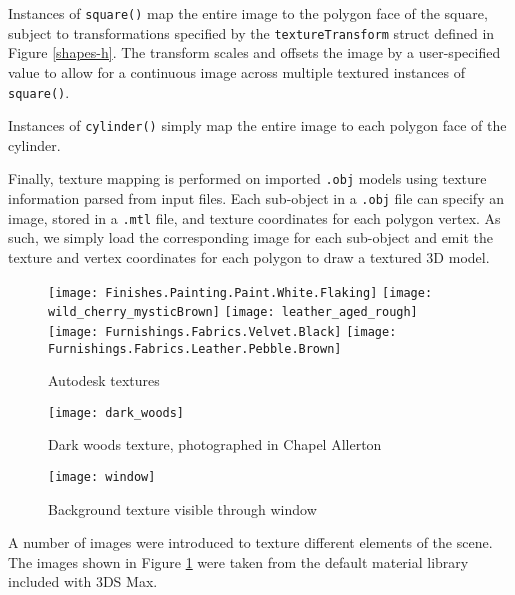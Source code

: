 \documentclass{article}
\begin{document}
		\bigskip
		
		Instances of \texttt{square()} map the entire image to the polygon face of the square, subject to
		transformations specified by the \texttt{textureTransform} struct defined in Figure \ref{shapes-h}.
		The transform scales and offsets the image by a user-specified value to allow for a continuous image
		across multiple textured instances of \texttt{square()}.

		\bigskip

		Instances of \texttt{cylinder()} simply map the entire image to each polygon face of the cylinder.
		
		\bigskip
		
		Finally, texture mapping is performed on imported \texttt{.obj} models using texture information
		parsed from input files. Each sub-object in a \texttt{.obj} file can specify an image, stored
		in a \texttt{.mtl} file, and texture coordinates for each polygon vertex. As such, we simply load the
		corresponding image for each sub-object and emit the texture and vertex coordinates for each polygon to
		draw a textured 3D model.

		\begin{minipage}{0.5\textwidth}
			\begin{figure}[H]
				\centering	
				\texttt{[image: Finishes.Painting.Paint.White.Flaking]}
				\texttt{[image: wild\_cherry\_mysticBrown]}
				\texttt{[image: leather\_aged\_rough]}
				\texttt{[image: Furnishings.Fabrics.Velvet.Black]}
				\texttt{[image: Furnishings.Fabrics.Leather.Pebble.Brown]}
				\caption{Autodesk textures}
				\label{autodesk-tex}
			\end{figure}
		\end{minipage}
		\begin{minipage}{0.5\textwidth}
			\begin{figure}[H]
				\centering	
				\texttt{[image: dark\_woods]}
				\caption{Dark woods texture, photographed in Chapel Allerton}
				\label{dark-woods}
			\end{figure}
		\end{minipage}

		\begin{figure}[H]
			\centering	
			\texttt{[image: window]}
			\caption{Background texture visible through window}
			\label{bg-texture}
		\end{figure}

		A number of images were introduced to texture different elements of the scene.
		The images shown in Figure \ref{autodesk-tex} were taken from the default material library included with 3DS Max.
		
\end{document}
